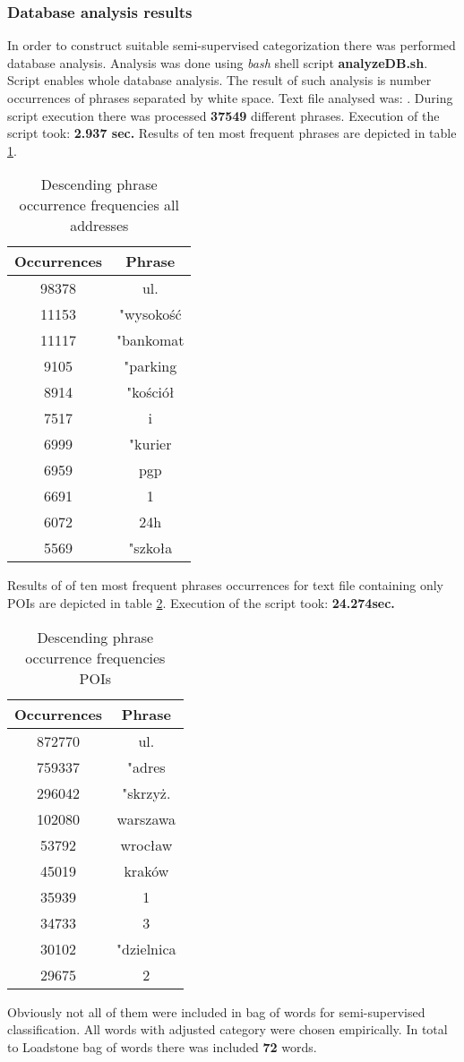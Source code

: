 \subsubsection{Database analysis results}
In order to construct suitable semi-supervised categorization there was performed database analysis. Analysis was done using \textit{bash} shell script \textbf{analyzeDB.sh}. Script enables whole database analysis. The result of such analysis is number occurrences of phrases separated by white space. Text file analysed was: \cite{29}. During script execution there was processed \textbf{37549} different phrases. Execution of the script took: \textbf{2.937 sec.} Results of ten most frequent phrases are depicted in table \ref{tab1}.
\begin{table}[H]
	\centering
	\begin{tabular}{ | c | c |}
		\hline
		Occurrences & Phrase\tabularnewline \hline
		98378 & ul.	\\
		11153 & "wysokość\\
		11117 & "bankomat\\
		9105  & "parking\\
		8914  & "kościół\\
		7517  & i\\
		6999  & "kurier\\
		6959  & pgp\\
		6691  & 1 \\
		6072  & 24h\\
		5569  & "szkoła\\		
		\hline
	\end{tabular}
	\caption{Descending phrase occurrence frequencies all addresses}
	\label{tab1}
\end{table}
Results of of ten most frequent phrases occurrences for text file containing only POIs are depicted in table \ref{tab2}. Execution of the script took: \textbf{24.274sec.}
\begin{table}[H]
	\centering
	\begin{tabular}{ | c | c |}
		\hline
		Occurrences & Phrase\\ \hline		
		872770& ul.\\
		759337& "adres\\
		296042& "skrzyż.\\
		102080& warszawa\\
		53792& wrocław\\
		45019& kraków\\
		35939& 1\\
		34733& 3\\
		30102& "dzielnica\\
		29675& 2	\\	
		\hline
	\end{tabular}
	\caption{Descending phrase occurrence frequencies POIs}
	\label{tab2}
\end{table}
Obviously not all of them were included in bag of words for semi-supervised classification. All words with adjusted category were chosen empirically. In total to Loadstone bag of words there was included \textbf{72} words.
